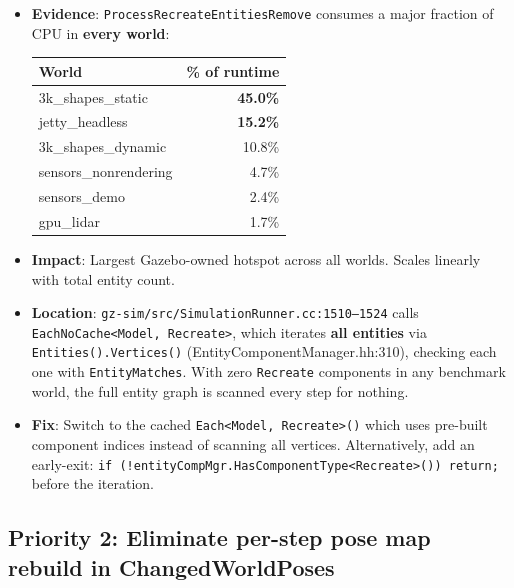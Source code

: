 \documentclass[11pt, a4paper]{article}
\providecommand{\tightlist}{%
  \setlength{\itemsep}{0pt}\setlength{\parskip}{0pt}}
\begin{document}
\begin{itemize}
\tightlist
\item
  \textbf{Evidence}: \texttt{ProcessRecreateEntitiesRemove} consumes a major fraction of CPU in \textbf{every world}:

\begin{center}
\begin{tabular}{lr}
\toprule
World & \% of runtime \\
\midrule
3k\_shapes\_static & \textbf{45.0\%} \\
jetty\_headless & \textbf{15.2\%} \\
3k\_shapes\_dynamic & 10.8\% \\
sensors\_nonrendering & 4.7\% \\
sensors\_demo & 2.4\% \\
gpu\_lidar & 1.7\% \\
\bottomrule
\end{tabular}
\end{center}

\item
  \textbf{Impact}: Largest Gazebo-owned hotspot across all worlds. Scales linearly with total entity count.
\item
  \textbf{Location}: \texttt{gz-sim/src/SimulationRunner.cc:1510--1524} calls \texttt{EachNoCache<Model, Recreate>}, which iterates \textbf{all entities} via \texttt{Entities().Vertices()} (EntityComponentManager.hh:310), checking each one with \texttt{EntityMatches}. With zero \texttt{Recreate} components in any benchmark world, the full entity graph is scanned every step for nothing.
\item
  \textbf{Fix}: Switch to the cached \texttt{Each<Model, Recreate>()} which uses pre-built component indices instead of scanning all vertices. Alternatively, add an early-exit: \texttt{if (!entityCompMgr.HasComponentType<Recreate>()) return;} before the iteration.
\end{itemize}

\subsection{Priority 2: Eliminate per-step pose map rebuild in ChangedWorldPoses}
\end{document}
